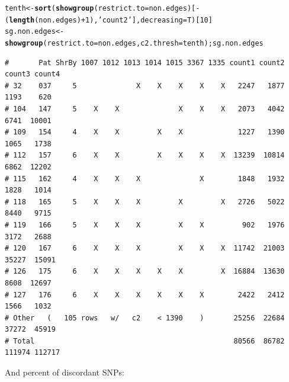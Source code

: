 \documentclass{article}\usepackage[]{graphicx}\usepackage[]{color}
\makeatletter
\newcommand{\hlnum}[1]{\textcolor[rgb]{0.686,0.059,0.569}{#1}}%
\newcommand{\hlstr}[1]{\textcolor[rgb]{0.192,0.494,0.8}{#1}}%
\newcommand{\hlopt}[1]{\textcolor[rgb]{0,0,0}{#1}}%
\newcommand{\hlstd}[1]{\textcolor[rgb]{0.345,0.345,0.345}{#1}}%
\newcommand{\hlkwb}[1]{\textcolor[rgb]{0.69,0.353,0.396}{#1}}%
\newcommand{\hlkwc}[1]{\textcolor[rgb]{0.333,0.667,0.333}{#1}}%
\newcommand{\hlkwd}[1]{\textcolor[rgb]{0.737,0.353,0.396}{\textbf{#1}}}%
\newenvironment{kframe}{%
 \def\at@end@of@kframe{}%
 \ifinner\ifhmode%
  \def\at@end@of@kframe{\end{minipage}}%
  \begin{minipage}{\columnwidth}%
 \fi\fi%
 \def\FrameCommand##1{\hskip\@totalleftmargin \hskip-\fboxsep
 \colorbox{shadecolor}{##1}\hskip-\fboxsep
     \hskip-\linewidth \hskip-\@totalleftmargin \hskip\columnwidth}%
 \MakeFramed {\advance\hsize-\width
   \@totalleftmargin\z@ \linewidth\hsize
   \@setminipage}}%
 {\par\unskip\endMakeFramed%
 \at@end@of@kframe}
\newenvironment{knitrout}{}{} %
\makeatother
\begin{document}
\begin{knitrout}\scriptsize
{}\color{fgcolor}\begin{kframe}
\begin{alltt}
\hlstd{tenth} \hlkwb{<-} \hlkwd{sort}\hlstd{(}\hlkwd{showgroup}\hlstd{(}\hlkwc{restrict.to}\hlstd{=non.edges)[}\hlopt{-}\hlstd{(}\hlkwd{length}\hlstd{(non.edges)}\hlopt{+}\hlnum{1}\hlstd{),}\hlstr{'count2'}\hlstd{],}\hlkwc{decreasing}\hlstd{=T)[}\hlnum{10}\hlstd{]}
\hlstd{sg.non.edges} \hlkwb{<-} \hlkwd{showgroup}\hlstd{(}\hlkwc{restrict.to}\hlstd{=non.edges,} \hlkwc{c2.thresh} \hlstd{= tenth) ; sg.non.edges}
\end{alltt}
\begin{verbatim}
#       Pat ShrBy 1007 1012 1013 1014 1015 3367 1335 count1 count2 count3 count4
# 32    037     5              X    X    X    X    X   2247   1877   1193    620
# 104   147     5    X    X              X    X    X   2073   4042   6741  10001
# 109   154     4    X    X         X    X             1227   1390   1065   1738
# 112   157     6    X    X         X    X    X    X  13239  10814   6862  12202
# 115   162     4    X    X    X              X        1848   1932   1828   1014
# 118   165     5    X    X    X         X         X   2726   5022   8440   9715
# 119   166     5    X    X    X         X    X         902   1976   3172   2688
# 120   167     6    X    X    X         X    X    X  11742  21003  35227  15091
# 126   175     6    X    X    X    X    X         X  16884  13630   8608  12697
# 127   176     6    X    X    X    X    X    X        2422   2412   1566   1032
# Other   (   105 rows   w/   c2    < 1390    )       25256  22684  37272  45919
# Total                                               80566  86782 111974 112717
\end{verbatim}
\end{kframe}
\end{knitrout}

And percent of discordant SNPs:
\end{document}

